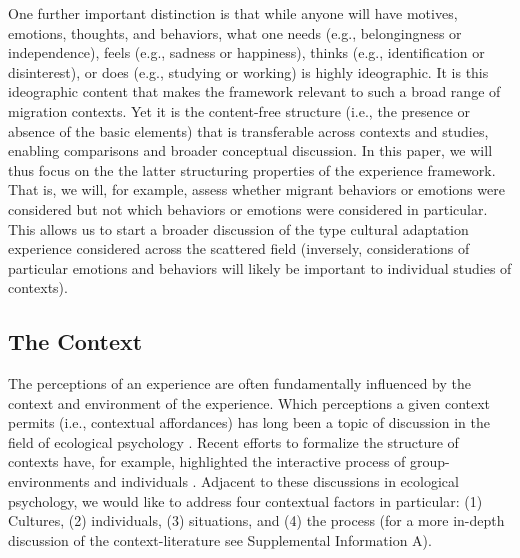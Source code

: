 \documentclass[man, 12pt, a4paper]{apa7}
\begin{document}
One further important distinction is that while anyone will have motives, emotions, thoughts, and behaviors, what one needs (e.g., belongingness or independence), feels (e.g., sadness or happiness), thinks (e.g., identification or disinterest), or does (e.g., studying or working) is highly ideographic. It is this ideographic content that makes the framework relevant to such a broad range of migration contexts. Yet it is the content-free structure (i.e., the presence or absence of the basic elements) that is transferable across contexts and studies, enabling comparisons and broader conceptual discussion. In this paper, we will thus focus on the the latter structuring properties of the experience framework. That is, we will, for example, assess whether migrant behaviors or emotions were considered but not which behaviors or emotions were considered in particular. This allows us to start a broader discussion of the type cultural adaptation experience considered across the scattered field (inversely, considerations of particular emotions and behaviors will likely be important to individual studies of contexts).

\subsection{The Context}
The perceptions of an experience are often fundamentally influenced by the context and environment of the experience. Which perceptions a given context permits (i.e., contextual affordances) has long been a topic of discussion in the field of ecological psychology \citep[e.g., see][]{Cantor1994}. Recent efforts to formalize the structure of contexts have, for example, highlighted the interactive process of group-environments and individuals \citep[e.g.,][]{Young2002}.
Adjacent to these discussions in ecological psychology, we would like to address four contextual factors in particular: (1) Cultures, (2) individuals, (3) situations, and (4) the process (for a more in-depth discussion of the context-literature see Supplemental Information A).
\end{document}
